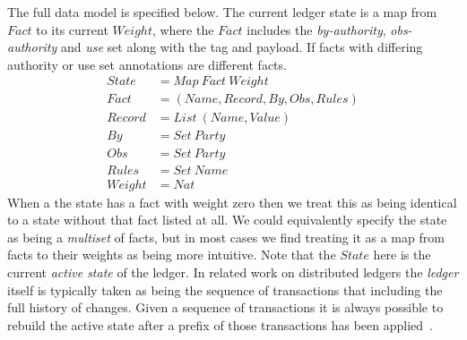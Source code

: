 The full data model is specified below. The current ledger state is a map from $Fact$ to its current $Weight$, where the $Fact$ includes the \emph{by-authority}, \emph{obs-authority} and \emph{use} set along with the tag and payload. If facts with differing authority or use set annotations are different facts.
$$
\begin{array}{ll}
   State   & = Map~ Fact~ Weight
\\ Fact    & = (Name, Record, By, Obs, Rules)
\\ Record  & = List~ (Name, Value)
\\ By      & = Set~ Party
\\ Obs     & = Set~ Party
\\ Rules   & = Set~ Name
\\ Weight  & = Nat
\end{array}
$$
When a the state has a fact with weight zero then we treat this as being identical to a state without that fact listed at all. We could equivalently specify the state as being a \emph{multiset} of facts, but in most cases we find treating it as a map from facts to their weights as being more intuitive. Note that the $State$ here is the current \emph{active state} of the ledger. In related work on distributed ledgers the \emph{ledger} itself is typically taken as being the sequence of transactions that including the full history of changes. Given a sequence of transactions it is always possible to rebuild the active state after a prefix of those transactions has been applied~\cite{Zahnentferner2018:Chimeric}.


\eject{}

